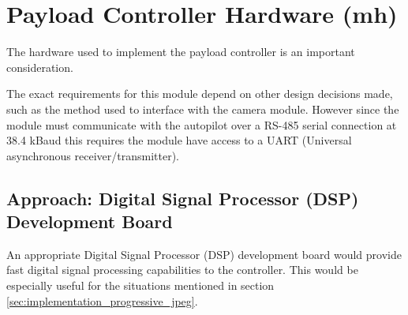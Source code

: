 \section{Payload Controller Hardware (mh)}
The hardware used to implement the payload controller is an important consideration.

The exact requirements for this module depend on other design decisions made, such as the method used to interface with the camera module. However since the module must communicate with the autopilot over a RS-485 serial connection at 38.4 kBaud this requires the module have access to a UART (Universal asynchronous receiver/transmitter).


 


\subsection{Approach: Digital Signal Processor (DSP) Development Board}
An appropriate Digital Signal Processor (DSP) development board would provide fast digital signal processing capabilities to the controller. This would be especially useful for the situations mentioned in section \ref{sec:implementation_progressive_jpeg}.

